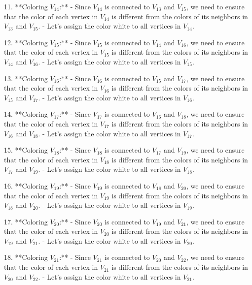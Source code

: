 11. **Coloring \(V_{14}\):**
    - Since \(V_{14}\) is connected to \(V_{13}\) and \(V_{15}\), we need to ensure that the color of each vertex in \(V_{14}\) is different from the colors of its neighbors in \(V_{13}\) and \(V_{15}\).
    - Let's assign the color white to all vertices in \(V_{14}\).

12. **Coloring \(V_{15}\):**
    - Since \(V_{15}\) is connected to \(V_{14}\) and \(V_{16}\), we need to ensure that the color of each vertex in \(V_{15}\) is different from the colors of its neighbors in \(V_{14}\) and \(V_{16}\).
    - Let's assign the color white to all vertices in \(V_{15}\).

13. **Coloring \(V_{16}\):**
    - Since \(V_{16}\) is connected to \(V_{15}\) and \(V_{17}\), we need to ensure that the color of each vertex in \(V_{16}\) is different from the colors of its neighbors in \(V_{15}\) and \(V_{17}\).
    - Let's assign the color white to all vertices in \(V_{16}\).

14. **Coloring \(V_{17}\):**
    - Since \(V_{17}\) is connected to \(V_{16}\) and \(V_{18}\), we need to ensure that the color of each vertex in \(V_{17}\) is different from the colors of its neighbors in \(V_{16}\) and \(V_{18}\).
    - Let's assign the color white to all vertices in \(V_{17}\).

15. **Coloring \(V_{18}\):**
    - Since \(V_{18}\) is connected to \(V_{17}\) and \(V_{19}\), we need to ensure that the color of each vertex in \(V_{18}\) is different from the colors of its neighbors in \(V_{17}\) and \(V_{19}\).
    - Let's assign the color white to all vertices in \(V_{18}\).

16. **Coloring \(V_{19}\):**
    - Since \(V_{19}\) is connected to \(V_{18}\) and \(V_{20}\), we need to ensure that the color of each vertex in \(V_{19}\) is different from the colors of its neighbors in \(V_{18}\) and \(V_{20}\).
    - Let's assign the color white to all vertices in \(V_{19}\).

17. **Coloring \(V_{20}\):**
    - Since \(V_{20}\) is connected to \(V_{19}\) and \(V_{21}\), we need to ensure that the color of each vertex in \(V_{20}\) is different from the colors of its neighbors in \(V_{19}\) and \(V_{21}\).
    - Let's assign the color white to all vertices in \(V_{20}\).

18. **Coloring \(V_{21}\):**
    - Since \(V_{21}\) is connected to \(V_{20}\) and \(V_{22}\), we need to ensure that the color of each vertex in \(V_{21}\) is different from the colors of its neighbors in \(V_{20}\) and \(V_{22}\).
    - Let's assign the color white to all vertices in \(V_{21}\).

